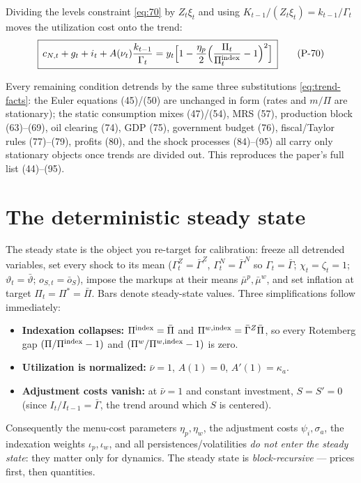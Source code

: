 Dividing the levels constraint \eqref{eq:70} by $Z_t\xi_t$ and using $K_{t-1}/(Z_t\xi_t)=k_{t-1}/\Gamma_t$
moves the utilization cost onto the trend:
\begin{equation}\label{eq:70d}
\boxed{\,c_{N,t}+g_t+i_t+A(\nu_t)\frac{k_{t-1}}{\Gamma_t}=y_t\Big[1-\frac{\eta_p}{2}\Big(\frac{\Pi_t}{\Pi^{\text{index}}_t}-1\Big)^2\Big]\,}\tag{P-70}
\end{equation}

\begin{remark}
Every remaining condition detrends by the same three substitutions \eqref{eq:trend-facts}: the Euler
equations (45)/(50) are unchanged in form (rates and $m/\Pi$ are stationary); the static consumption
mixes (47)/(54), MRS (57), production block (63)--(69), oil clearing (74), GDP (75), government budget
(76), fiscal/Taylor rules (77)--(79), profits (80), and the shock processes (84)--(95) all carry only
stationary objects once trends are divided out. This reproduces the paper's full list (44)--(95).
\end{remark}

\section{The deterministic steady state}\label{sec:ss}

The steady state is the object you re-target for calibration: freeze all detrended variables, set every
shock to its mean ($\Gamma^Z_t=\bar\Gamma^Z$, $\Gamma^N_t=\bar\Gamma^N$ so $\Gamma_t=\bar\Gamma$;
$\chi_t=\zeta_t=1$; $\vartheta_t=\bar\vartheta$; $o_{S,t}=\bar o_S$), impose the markups at their means
$\bar\mu^p,\bar\mu^w$, and set inflation at target $\Pi_t=\Pi^*=\bar\Pi$. Bars denote steady-state
values. Three simplifications follow immediately:
\begin{itemize}[nosep]
\item \textbf{Indexation collapses:} $\Pi^{\text{index}}=\bar\Pi$ and $\Pi^{w,\text{index}}=\bar\Gamma^Z\bar\Pi$, so
every Rotemberg gap $(\Pi/\Pi^{\text{index}}-1)$ and $(\Pi^w/\Pi^{w,\text{index}}-1)$ is zero.
\item \textbf{Utilization is normalized:} $\bar\nu=1$, $A(1)=0$, $A'(1)=\kappa_a$.
\item \textbf{Adjustment costs vanish:} at $\bar\nu=1$ and constant investment, $S=S'=0$ (since
$I_t/I_{t-1}=\bar\Gamma$, the trend around which $S$ is centered).
\end{itemize}
Consequently the menu-cost parameters $\eta_p,\eta_w$, the adjustment costs $\psi_i,\sigma_a$, the
indexation weights $\iota_p,\iota_w$, and all persistences/volatilities \emph{do not enter the steady
state}: they matter only for dynamics. The steady state is \emph{block-recursive} --- prices first,
then quantities.

